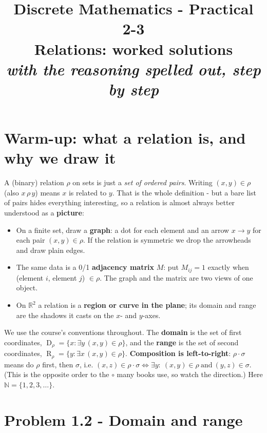 \documentclass[11pt,a4paper]{article}
\title{\vspace{-1.2cm}\textbf{Discrete Mathematics - Practical 2-3}\\[2pt]
\large Relations: worked solutions\\[2pt]
\normalsize\itshape with the reasoning spelled out, step by step}
\author{}
\date{}
\newcommand{\R}{\mathbb{R}}
\newcommand{\N}{\mathbb{N}}
\DeclareMathOperator{\Dom}{D}
\DeclareMathOperator{\Ran}{R}
\begin{document}
\maketitle
\vspace{-1.0cm}

\section*{Warm-up: what a relation is, and why we draw it}

A (binary) relation $\rho$ on sets is just a \emph{set of ordered pairs}. Writing
$(x,y)\in\rho$ (also $x\,\rho\,y$) means \textquotedbl{}$x$ is related to $y$\textquotedbl{}.
That is the whole definition - but a bare list of pairs hides everything interesting, so a relation
is almost always better understood as a \textbf{picture}:

\begin{itemize}[leftmargin=1.4em,itemsep=2pt,topsep=2pt]
\item On a finite set, draw a \textbf{graph}: a dot for each element and an arrow $x\to y$ for each
  pair $(x,y)\in\rho$. If the relation is symmetric we drop the arrowheads and draw plain edges.
\item The same data is a 0/1 \textbf{adjacency matrix} $M$: put $M_{ij}=1$ exactly when
  (element $i$, element $j$) $\in\rho$. The graph and the matrix are two views of one object.
\item On $\R^2$ a relation is a \textbf{region or curve in the plane}; its domain and range are the
  shadows it casts on the $x$- and $y$-axes.
\end{itemize}

We use the course's conventions throughout. The \textbf{domain} is the set of first coordinates,
$\Dom_\rho=\{x:\exists y\,(x,y)\in\rho\}$, and the \textbf{range} is the set of second coordinates,
$\Ran_\rho=\{y:\exists x\,(x,y)\in\rho\}$. \textbf{Composition is left-to-right}: $\rho\cdot\sigma$
means \textquotedbl{}do $\rho$ first, then $\sigma$\textquotedbl{}, i.e.
$(x,z)\in\rho\cdot\sigma \iff \exists y:\ (x,y)\in\rho\ \text{and}\ (y,z)\in\sigma$. (This is the
opposite order to the $\circ$ many books use, so watch the direction.) Here $\N=\{1,2,3,\dots\}$.

\section*{Problem 1.2 - Domain and range}
\end{document}
